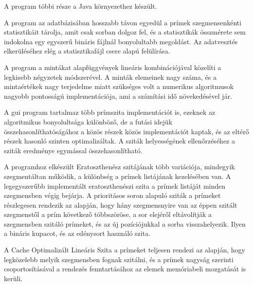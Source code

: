 A program többi része a Java környezethez készült.

A program az adatbázisában hosszabb távon egyedül a prímek szegmensenkénti statisztikáit tárolja,
amit csak sorban dolgoz fel, és a statisztikák összmérete sem indokolna egy egyszerű bináris fájlnál bonyolultabb megoldást.
Az adatvesztés elkerüléséhez elég a statisztikafájl csere alapú felülírása.

A program a mintákat alapfüggvények lineáris kombinációjával közelíti a legkisebb négyzetek módszerével. A minták elemeinek nagy száma, és a mintaértékek
nagy terjedelme miatt szükséges volt a numerikus algoritmusok nagyobb pontosságú
implementációja, ami a számítási idő növekedésével jár.

A gui program tartalmaz több prímszita implementációt is, ezeknek az algoritmikus
bonyolultsága különböző, de a futási idejük összehasonlíthatóságához a közös részek közös
implementációt kaptak, és az eltérő részek hasonló szinten optimalizáltak.
A sziták helyességének ellenőrzéséhez a sziták eredménye egymással összehasonlítható.

A programhoz elkészült Eratoszthenész szitájának több variációja, mindegyik szegmentáltan működik,
a különbség a prímek listájának kezelésében van.
A legegyszerűbb implementált eratoszthenészi szita a prímek listáját minden szegmensben végig bejárja.
A prioritásos soron alapuló sziták a prímeket részlegesen rendezik az alapján, hogy hány szegmensnyire van az éppen szitált szegmenstől a prím következő többszöröse, a sor elejéről eltávolítják a szegmensben szitáló prímeket, és az új pozíciójukkal a sorba visszahelyezik.
Ilyen a bináris kupacot, és az edénysort használó szita.

A Cache Optimalizált Lineáris Szita a prímeket teljesen rendezi az alapján, hogy legközelebb melyik szegmensben fognak szitálni, és a prímek nagyság szerinti csoportosításával a rendezés fenntartásához az elemek memóriabeli mozgatását is kerüli.

